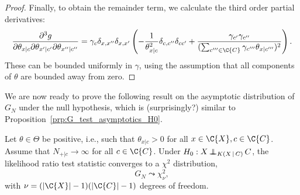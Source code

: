 \begin{proof}
Finally, to obtain the remainder term, we calculate the third order partial derivatives:
  $$\frac{\partial^3 g}{\partial \theta_{x|c} \partial \theta_{x'|c'} \partial \theta_{x''|c''}} = 
  \gamma_c \delta_{x,x''} \delta_{x,x'} \left( -\frac{1}{\theta_{x|c}^2} \delta_{c,c''} \delta_{cc'} + \frac{\gamma_{c'}\gamma_{c''} }{(\sum_{c'''\in\C{C}} \gamma_{c'''} \theta_{x|c'''})^2} \right).
  $$
These can be bounded uniformly in $\gamma$, using the assumption that all components of $\theta$ are bounded away from zero.
\end{proof}
We are now ready to prove the following result on the asymptotic distribution of $G_N$ under the null hypothesis, which is (surprisingly?) similar to Proposition~\ref{prp:G_test_asymptotics_H0}.
\begin{Prp}\label{prp:ext_G_test_asymptotics_H0}
  Let $\theta \in \Theta$ be positive, i.e., such that $\theta_{x|c} > 0$ for all $x \in \C{X}, c \in \C{C}$.
  Assume that $N_{+|c} \to \infty$ for all $c \in \C{C}$.
  Under $H_0 : X \operatorname*{\perp\mkern-11mu\perp}_{K(X \operatorname*{|} C)} C$, the likelihood ratio test statistic  converges
  to a $\chi^2$ distribution,
  $$G_N \leadsto \chi^2_\nu,$$
  with $\nu = (|\C{X}| - 1)(|\C{C}| - 1)$ degrees of freedom.
\end{Prp}
